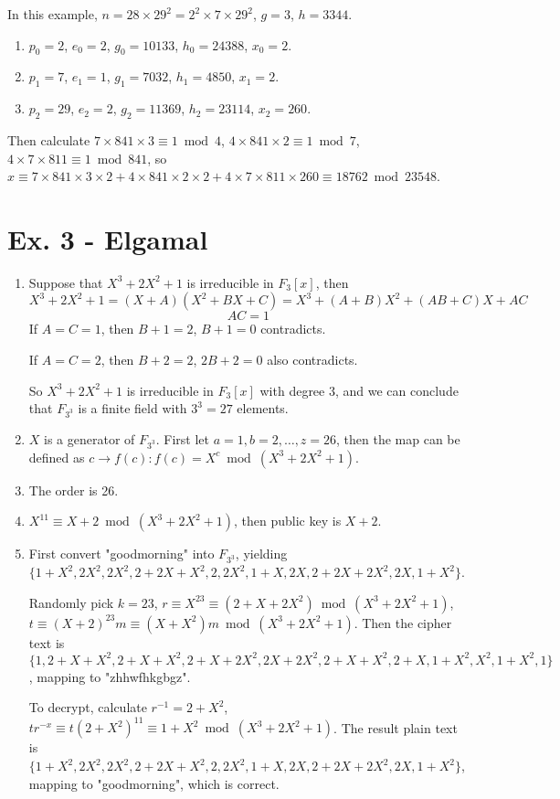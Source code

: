 \documentclass[12pt]{article}
\begin{document}
	In this example, $n=28\times29^2=2^2\times7\times29^2$, $g=3$, $h=3344$.
	\begin{enumerate}
		\item $p_0=2$, $e_0=2$, $g_0=10133$, $h_0=24388$, $x_0=2$.
		\item $p_1=7$, $e_1=1$, $g_1=7032$, $h_1=4850$, $x_1=2$.
		\item $p_2=29$, $e_2=2$, $g_2=11369$, $h_2=23114$, $x_2=260$.
	\end{enumerate}

	Then calculate $7\times841\times3\equiv1\bmod4$, $4\times841\times2\equiv1\bmod7$, $4\times7\times811\equiv1\bmod841$, so $x\equiv7\times841\times3\times2+4\times841\times2\times2+4\times7\times811\times260\equiv18762\bmod23548$.

\section*{Ex. 3 - Elgamal}

	\begin{enumerate}
		\item
			Suppose that $X^3+2X^2+1$ is irreducible in $F_3[x]$, then
			$$X^3+2X^2+1=(X+A)(X^2+BX+C)=X^3+(A+B)X^2+(AB+C)X+AC$$
			$$AC=1$$
			If $A=C=1$, then $B+1=2$, $B+1=0$ contradicts.

			If $A=C=2$, then $B+2=2$, $2B+2=0$ also contradicts.

			So $X^3+2X^2+1$ is irreducible in $F_3[x]$ with degree 3, and we can conclude that $F_{3^3}$ is a finite field with $3^3=27$ elements.
		\item
			$X$ is a generator of $F_{3^3}$. First let $a=1,b=2,\ldots,z=26$, then the map can be defined as $c \rightarrow f(c):f(c)=X^c\bmod(X^3+2X^2+1)$.
		\item
			The order is 26.
		\item
			$X^{11}\equiv X+2\bmod(X^3+2X^2+1)$, then public key is $X+2$.
		\item
			First convert "goodmorning" into $F_{3^3}$, yielding $\{1+X^2,2X^2,2X^2,2+2X+X^2,2,2X^2,1+X,2X,2+2X+2X^2,2X,1+X^2\}$.

			Randomly pick $k=23$, $r\equiv X^{23}\equiv(2+X+2X^2)\bmod(X^3+2X^2+1)$, $t\equiv(X+2)^{23}m\equiv(X+X^2)m\bmod(X^3+2X^2+1)$. Then the cipher text is $\{1,2+X+X^2,2+X+X^2,2+X+2 X^2,2 X+2 X^2,2+X+X^2,2+X,1+X^2,X^2,1+X^2,1\}$, mapping to "zhhwfhkgbgz".

			To decrypt, calculate $r^{-1}=2+X^2$, $tr^{-x}\equiv t(2+X^2)^{11}\equiv 1+X^2\bmod(X^3+2X^2+1)$. The result plain text is $\{1+X^2,2X^2,2X^2,2+2X+X^2,2,2X^2,1+X,2X,2+2X+2X^2,2X,1+X^2\}$, mapping to "goodmorning", which is correct.
	\end{enumerate}
\end{document}
